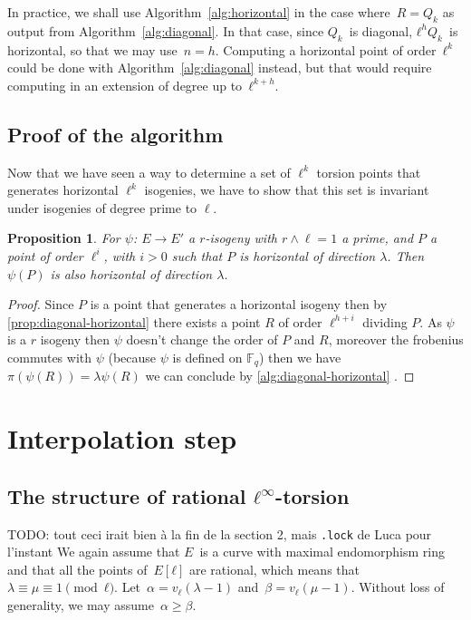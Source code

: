 \documentclass{lms}
\newcommand{\todo}[1]{{\color{red}TODO: #1}}
\newtheorem{prop}[thm]{Proposition}
\begin{document}
In practice, we shall use Algorithm~\ref{alg:horizontal}
in the case where~$R = Q_{k}$ as output from Algorithm~\ref{alg:diagonal}.
In that case, since $Q_k$~is diagonal, $ℓ^{h} Q_k$~is horizontal,
so that we may use~$n=h$.
Computing a horizontal point of order~$ℓ^k$ could be done
with Algorithm~\ref{alg:diagonal} instead,
but that would require computing in an extension
of degree up to~$ℓ^{k+h}$.


\subsection{Proof of the algorithm}
Now that we have seen a way to determine a set of $\ell^{k}$ torsion points that generates horizontal $\ell^k$ isogenies, we have to show that this set is invariant under isogenies of degree prime to $\ell$.

\begin{prop} \label{prop:horizontal-invariance}
For $\psi$: $E \rightarrow E'$ a $r$-isogeny  with $r \wedge \ell=1$ a prime, and $P$ a point of order $\ell^i$, with $i>0$ such that $P $ is horizontal of direction $\lambda$. Then $\psi(P)$ is also horizontal of direction $\lambda$.
\end{prop}

\begin{proof}
Since $P$ is a point that generates a horizontal isogeny then by \ref{prop:diagonal-horizontal} there exists a point $R$ of order $\ell^{h+i}$ dividing $P$. As $\psi$ is a $r$ isogeny then $\psi$ doesn't change the order of $P$ and $R$, moreover the frobenius commutes with $\psi$ (because $\psi$ is defined on $\mathbb{F}_q$) then we have $\pi(\psi(R))=\lambda\psi(R)$ we can conclude by \ref{alg:diagonal-horizontal}  .
\end{proof}




\section{Interpolation step}
\label{sec:interpolation}

\subsection{The structure of rational $ℓ^∞$-torsion}

\todo{tout ceci irait bien à la fin de la section 2, mais \texttt{.lock}
de Luca pour l'instant}
We again assume that $E$~is a curve with maximal endomorphism ring
and that all the points of~$E[ℓ]$ are rational,
which means that~$λ ≡ μ ≡ 1 \pmod{ℓ}$.
Let~$α = v_{ℓ} (λ - 1)$ and~$β = v_{ℓ} (μ - 1)$.
Without loss of generality, we may assume~$α ≥ β$.
\end{document}
